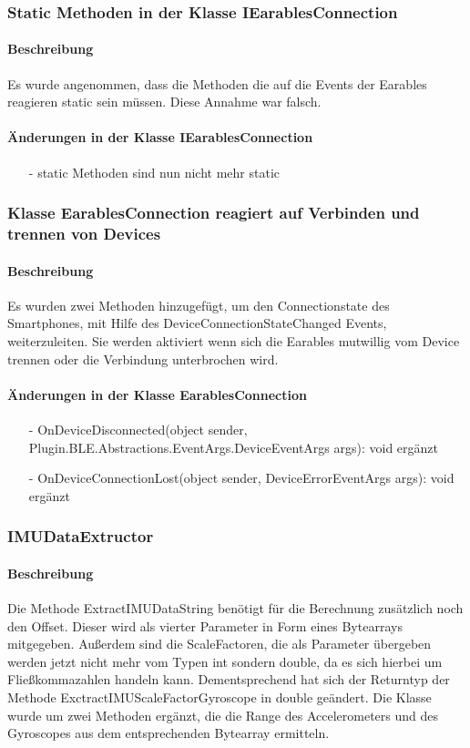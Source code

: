 \documentclass[a4paper,12pt]{article}
\begin{document}
\subsubsection{Static Methoden in der Klasse IEarablesConnection}
\paragraph{Beschreibung}
Es wurde angenommen, dass die Methoden die auf die Events der Earables reagieren static sein müssen. Diese Annahme war falsch.
\paragraph{Änderungen in der Klasse IEarablesConnection}
\begin{itemize}
	 \item[-] static Methoden sind nun nicht mehr static
\end{itemize}

\subsubsection{Klasse EarablesConnection reagiert auf Verbinden und trennen von Devices}
\paragraph{Beschreibung}
Es wurden zwei Methoden hinzugefügt, um den Connectionstate des Smartphones, mit Hilfe des DeviceConnectionStateChanged Events, weiterzuleiten. Sie werden aktiviert wenn sich die Earables mutwillig vom Device trennen oder die Verbindung unterbrochen wird.
\paragraph{Änderungen in der Klasse EarablesConnection}
\begin{itemize}
	 \item[-] OnDeviceDisconnected(object sender, Plugin.BLE.Abstractions.EventArgs.DeviceEventArgs args): void ergänzt
	\item[-]  OnDeviceConnectionLost(object sender, DeviceErrorEventArgs args): void ergänzt
\end{itemize}

\subsubsection{IMUDataExtructor}
\paragraph{Beschreibung}
Die Methode ExtractIMUDataString benötigt für die Berechnung zusätzlich noch den Offset. Dieser wird als vierter Parameter in Form eines Bytearrays mitgegeben. Außerdem sind die ScaleFactoren, die als Parameter übergeben werden jetzt nicht mehr vom Typen int sondern double, da es sich hierbei um Fließkommazahlen handeln kann. Dementsprechend hat sich der Returntyp der Methode ExctractIMUScaleFactorGyroscope in double geändert.
Die Klasse wurde um zwei Methoden ergänzt, die die Range des Accelerometers und des Gyroscopes aus dem entsprechenden Bytearray ermitteln.
\end{document}
